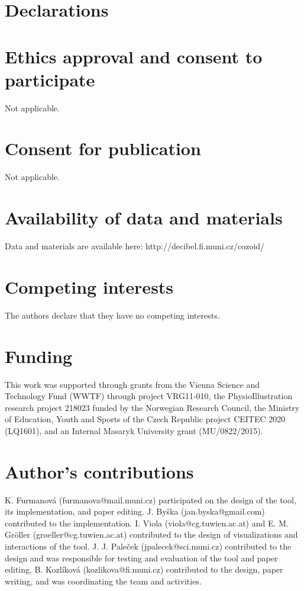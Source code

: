 \documentclass[twocolumn]{bmcart}%
\begin{document}
\section*{Declarations}
\begin{backmatter}

\section*{Ethics approval and consent to participate}
Not applicable.

\section*{Consent for publication}
Not applicable.

\section*{Availability of data and materials}
Data and materials are available here: http://decibel.fi.muni.cz/cozoid/

\section*{Competing interests}
  The authors declare that they have no competing interests.
	
\section*{Funding}
This work was supported through grants from the Vienna Science and Technology Fund (WWTF) through project VRG11-010, the PhysioIllustration research project 218023 funded by the Norwegian Research Council, the Ministry of Education, Youth and Sports of the Czech Republic project CEITEC 2020 (LQ1601), and an Internal Masaryk University grant (MU/0822/2015). 

\section*{Author's contributions}
K. Furmanov\'{a} (furmanova@mail.muni.cz) participated on the design of the tool, its implementation, and paper editing.  J. By\v{s}ka (jan.byska@gmail.com) contributed to the implementation. I. Viola (viola@cg.tuwien.ac.at) and E. M. Gr\"{o}ller (groeller@cg.tuwien.ac.at) contributed to the design of visualizations and interactions of the tool. J. J. Pale\v{c}ek (jpalecek@sci.muni.cz) contributed to the design and was responsible for testing and evaluation of the tool and paper editing. B. Kozl\'{i}kov\'{a} (kozlikova@fi.muni.cz) contributed to the design, paper writing, and was coordinating the team and activities.


\end{backmatter}
\end{document}

